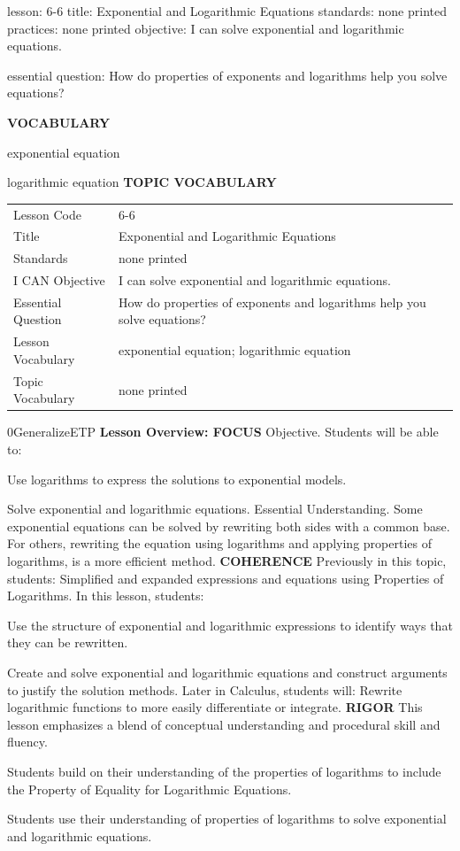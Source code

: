 \documentclass{article}
\newenvironment{lesson-meta}{}{}        %
\newenvironment{te-addendum}[2]{}{}     %
\newcommand{\te}[1]{}                   %
\begin{document}
\begin{lesson-meta}
lesson: 6-6
title: Exponential and Logarithmic Equations
standards: none printed
practices: none printed
objective: I can solve exponential and logarithmic equations.

essential question: How do properties of exponents and logarithms help you solve equations?

\textbf{VOCABULARY}
\item exponential equation
\item logarithmic equation
\textbf{TOPIC VOCABULARY}
\te{No separate topic vocabulary list is printed on these lesson pages.}
\begin{tabular}{ll}
Lesson Code & 6-6 \\
Title & Exponential and Logarithmic Equations \\
Standards & none printed \\
I CAN Objective & I can solve exponential and logarithmic equations. \\
Essential Question & How do properties of exponents and logarithms help you solve equations? \\
Lesson Vocabulary & exponential equation; logarithmic equation \\
Topic Vocabulary & none printed \\
\end{tabular}
\end{lesson-meta}
\begin{te-addendum}{0}{GeneralizeETP}
\textbf{Lesson Overview: FOCUS}
Objective. Students will be able to:
\item Use logarithms to express the solutions to exponential models.
\item Solve exponential and logarithmic equations.
Essential Understanding. Some exponential equations can be solved by rewriting both sides with a common base. For others, rewriting the equation using logarithms and applying properties of logarithms, is a more efficient method.
\textbf{COHERENCE}
Previously in this topic, students: Simplified and expanded expressions and equations using Properties of Logarithms.
In this lesson, students:
\item Use the structure of exponential and logarithmic expressions to identify ways that they can be rewritten.
\item Create and solve exponential and logarithmic equations and construct arguments to justify the solution methods.
Later in Calculus, students will: Rewrite logarithmic functions to more easily differentiate or integrate.
\textbf{RIGOR}
This lesson emphasizes a blend of conceptual understanding and procedural skill and fluency.
\item Students build on their understanding of the properties of logarithms to include the Property of Equality for Logarithmic Equations.
\item Students use their understanding of properties of logarithms to solve exponential and logarithmic equations.
\end{te-addendum}
\end{document}
